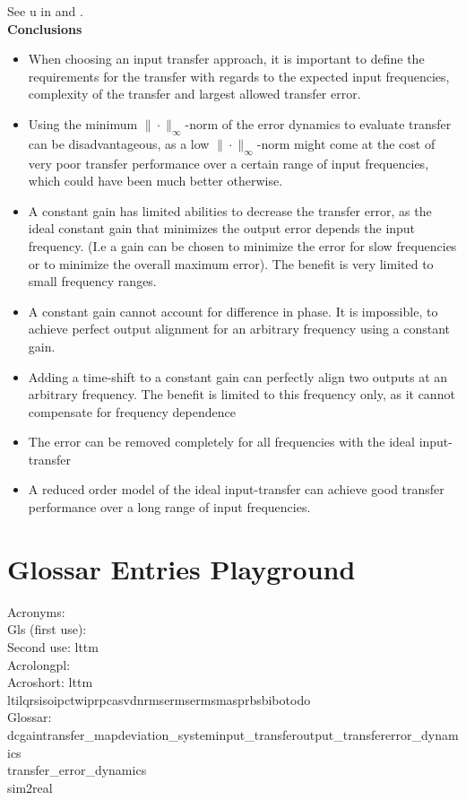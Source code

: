 \begin{example}
	See u in  and . \\
	\textbf{Conclusions}
	\vspace{-0.5em}
	\begin{itemize}[noitemsep, topsep=0pt]
		\item When choosing an input transfer approach, it is important to define the requirements for the transfer with regards to the expected input frequencies, complexity of the transfer and largest allowed transfer error.
		\item Using the minimum $\|\cdot\|_{\infty}$-norm of the error dynamics to evaluate transfer can be disadvantageous, as a low $\|\cdot\|_{\infty}$-norm might come at the cost of very poor transfer performance over a certain range of input frequencies, which could have been much better otherwise.	
		\item A constant gain has limited abilities to decrease the transfer error, as the ideal constant gain that minimizes the output error depends the input frequency. (I.e a gain can be chosen to minimize the error for slow frequencies or to minimize the overall maximum error).  The benefit is very limited to small frequency ranges.
		\item A constant gain cannot account for difference in phase. It is impossible, to achieve perfect output alignment for an arbitrary frequency using a constant gain. 
		\item Adding a time-shift to a constant gain can perfectly align two outputs at an arbitrary frequency. The benefit is limited to this frequency only, as it cannot compensate for frequency dependence 
		\item The error can be removed completely for all frequencies with the ideal input-transfer
		\item A reduced order model of the ideal input-transfer can achieve good transfer performance over a long range of input frequencies. 
	\end{itemize}
\end{example}

\section{Glossar Entries Playground}
Acronyms:\\
Gls (first use): \\
Second use: \gls*{lttm}\\
Acrolongpl: \\
Acroshort: \acrshort{lttm}\\
\gls{lti}\gls{lqr}\gls{siso}\gls{ipc}\gls{twipr}\gls{pca}\gls{svd}\gls{nrmse}\gls{rmse}\gls{rms}\gls{mas}\gls{prbs}\gls{bibo}\gls{todo}\\
Glossar:\\
\gls{dcgain}\gls{transfer_map}\gls{deviation_system}\gls{input_transfer}\gls{output_transfer}\gls{error_dynamics}\\
\Gls{transfer_error_dynamics}\\
\gls{sim2real}\\

\lipsum[1] %



